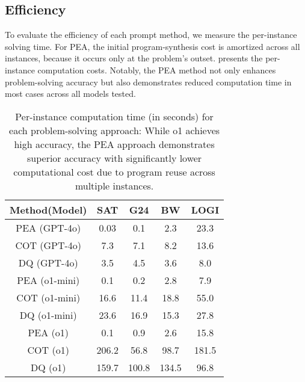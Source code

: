 \subsection{Efficiency}\label{sec:eff}
To evaluate the efficiency of each prompt method, we measure the per-instance solving time. For  PEA, the initial program-synthesis cost is amortized across all instances, because it occurs only at the problem's outset.  presents the per-instance computation costs. Notably, the PEA method not only enhances problem-solving accuracy but also demonstrates reduced computation time in most cases across all models tested.
\begin{table}
\begin{center}
    \caption{Per-instance computation time (in seconds) for each problem-solving approach:
While o1 achieves high accuracy, the PEA approach demonstrates superior accuracy with significantly lower computational cost due to program reuse across multiple instances.}
    \label{tab:efficiency}
    \begin{tabular}{ ccccc } 
        \toprule \bf Method(Model) & \bf SAT & \bf G24 & \bf BW  & \bf LOGI  \\
        \hline PEA (GPT-4o) & 0.03 & 0.1 & 2.3 & 23.3 \\  
        \hline COT (GPT-4o) & 7.3 & 7.1 & 8.2 & 13.6 \\
        
        \hline DQ (GPT-4o) &  3.5 & 4.5 & 3.6 & 8.0 \\
        \midrule
        \hline PEA (o1-mini) & 0.1 & 0.2 & 2.8 & 7.9 \\  
        \hline COT (o1-mini) & 16.6 & 11.4 & 18.8 & 55.0 \\
        \hline DQ (o1-mini) & 23.6 & 16.9 & 15.3 & 27.8 \\
        \midrule
        \hline PEA (o1) & 0.1 & 0.9 & 2.6 & 15.8 \\  
        \hline COT (o1) & 206.2 & 56.8 & 98.7 & 181.5 \\
        \hline DQ (o1) & 159.7 & 100.8 & 134.5 & 96.8 \\
        \bottomrule
    \end{tabular}
\end{center}
\vspace{-0.3cm}
\end{table}

